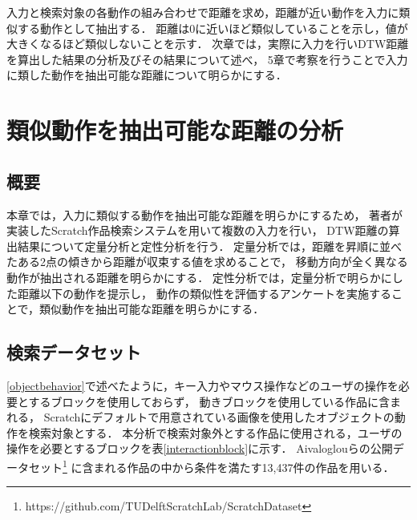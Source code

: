 \documentclass[11pt]{jreport}
\begin{document}
入力と検索対象の各動作の組み合わせで距離を求め，距離が近い動作を入力に類似する動作として抽出する．
距離は0に近いほど類似していることを示し，値が大きくなるほど類似しないことを示す．
次章では，実際に入力を行いDTW距離を算出した結果の分析及びその結果について述べ，
5章で考察を行うことで入力に類した動作を抽出可能な距離について明らかにする．


\chapter{類似動作を抽出可能な距離の分析}
\label{analysys}

\section{概要}
本章では，入力に類似する動作を抽出可能な距離を明らかにするため，
著者が実装したScratch作品検索システムを用いて複数の入力を行い，
DTW距離の算出結果について定量分析と定性分析を行う．
定量分析では，距離を昇順に並べたある2点の傾きから距離が収束する値を求めることで，
移動方向が全く異なる動作が抽出される距離を明らかにする．
定性分析では，定量分析で明らかにした距離以下の動作を提示し，
動作の類似性を評価するアンケートを実施することで，類似動作を抽出可能な距離を明らかにする．

\section{検索データセット}
\ref{objectbehavior}で述べたように，キー入力やマウス操作などのユーザの操作を必要とするブロックを使用しておらず，
動きブロックを使用している作品に含まれる，
Scratchにデフォルトで用意されている画像を使用したオブジェクトの動作を検索対象とする．
本分析で検索対象外とする作品に使用される，ユーザの操作を必要とするブロックを表\ref{interactionblock}に示す．
Aivaloglouらの公開データセット\cite{dataset}\footnote{https://github.com/TUDelftScratchLab/ScratchDataset}
に含まれる作品の中から条件を満たす13,437件の作品を用いる．
\end{document}
